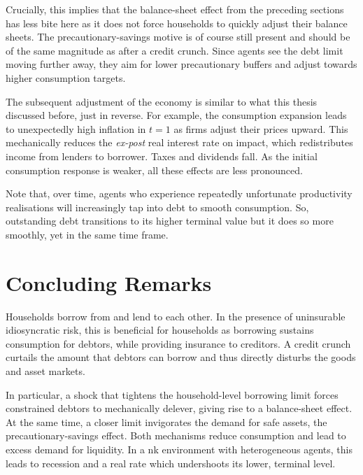 \documentclass[a4paper,12pt]{article} %
\numberwithin{equation}{section} %
\numberwithin{figure}{section}
\numberwithin{table}{section}
\begin{document}
Crucially, this implies that the balance-sheet effect from the preceding sections has less bite here as it does not force households to quickly adjust their balance sheets. The precautionary-savings motive is of course still present and should be of the same magnitude as after a credit crunch. Since agents see the debt limit moving further away, they aim for lower precautionary buffers and adjust towards higher consumption targets. 

The subsequent adjustment of the economy is similar to what this thesis discussed before, just in reverse. For example, the consumption expansion leads to  unexpectedly high inflation in $t=1$ as firms adjust their prices upward. This mechanically reduces the \textit{ex-post} real interest rate on impact, which redistributes income from lenders to borrower. Taxes and dividends fall. As the initial consumption response is weaker, all these effects are less pronounced. 

Note that, over time, agents who experience repeatedly unfortunate productivity realisations will increasingly tap into debt to smooth consumption. So, outstanding debt transitions to its higher terminal value but it does so more smoothly, yet in the same time frame.

\section{Concluding Remarks}
\label{sec:conclusion}

Households borrow from and lend to each other. In the presence of uninsurable idiosyncratic risk, this is beneficial for households as borrowing sustains consumption for debtors, while providing insurance to creditors. A credit crunch curtails the amount that debtors can borrow and thus directly disturbs the goods and asset markets.

In particular, a shock that tightens the household-level borrowing limit forces constrained debtors to mechanically delever, giving rise to a balance-sheet effect. At the same time, a closer limit invigorates the demand for safe assets, the precautionary-savings effect. Both mechanisms reduce consumption and lead to excess demand for liquidity. In a \Gls{nk} environment with heterogeneous agents, this leads to recession and a real rate which undershoots its lower, terminal level.
\end{document}
